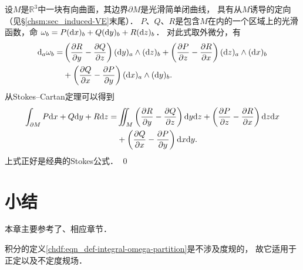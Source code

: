 \begin{example}
    设$M$是$\mathbb{R}^3$中一块有向曲面，其边界$\partial M$是光滑简单闭曲线，
    具有从$M$诱导的定向（见\S\ref{chsm:sec_induced-VE}末尾）．
    $P$、$Q$、$R$是包含$M$在内的一个区域上的光滑函数，命
    $ \omega_b= P({\rm d}x)_b+  Q({\rm d}y)_b + R({\rm d}z)_b $．
    对此式取外微分，有
    \begin{align*}
        {\rm d}_a\omega_{b} = &
        \left(\frac{\partial R}{\partial y}-\frac{\partial Q}{\partial z}\right) ({\rm d}y)_a\wedge ({\rm d}z)_b +
        \left(\frac{\partial P}{\partial z}-\frac{\partial R}{\partial x}\right) ({\rm d}z)_a\wedge ({\rm d}x)_b \\
        &+ \left(\frac{\partial Q}{\partial x}-\frac{\partial P}{\partial y}\right) ({\rm d}x)_a\wedge ({\rm d}y)_b .
    \end{align*}
    从Stokes--Cartan定理可以得到
    \begin{align*}
        \int_{\partial M} P{\rm d}x+  Q{\rm d}y + R{\rm d}z =  &    \iint_{M} 
        \left(\frac{\partial R}{\partial y}-\frac{\partial Q}{\partial z}\right) {\rm d}y {\rm d}z +
        \left(\frac{\partial P}{\partial z}-\frac{\partial R}{\partial x}\right) {\rm d}z {\rm d}x \\
        &+\left(\frac{\partial Q}{\partial x}-\frac{\partial P}{\partial y}\right) {\rm d}x {\rm d}y .
    \end{align*} %
    上式正好是经典的Stokes公式． \qed
\end{example}


\section*{小结}
本章主要参考了\parencite{cc2001-zh}、\parencite{chenwh2001}相应章节．

积分的定义\eqref{chdf:eqn_def-integral-omega-partition}是不涉及度规的，
故它适用于正定以及不定度规场．


\printbibliography[heading=subbibliography,title=第\ref{chdf}章参考文献]
\endinput
